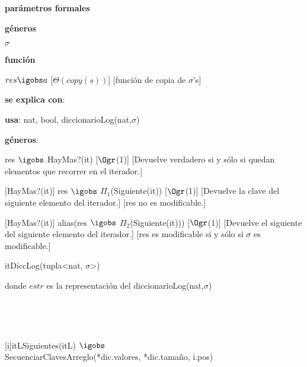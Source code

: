 \begin{Interfaz}

	\textbf{parámetros formales}\parindent\\
	\parbox{1.7cm}{\textbf{géneros}} $\sigma$\\
	\parbox[t]{1.7cm}{\textbf{función}}\parbox[t]{\textwidth-2\parindent-1.7cm}{%
	    	{$res \igobs a$}
		[$\Theta(copy(s))$]
		[función de copia de $\sigma$'s]
	}
	
	\textbf{se explica con}: 
	
	\textbf{usa}: nat, bool, diccionarioLog(nat,$\sigma$)
	
	\textbf{géneros}: 
	


	{res $\igobs$ HayMas?(it)}
	[$\Ogr$(1)]
	[Devuelve verdadero si y sólo si quedan elementos que recorrer en el iterador.]
	
	[HayMas?(it)]
	{res $\igobs$ $\Pi_1$(Siguiente(it))}
	[$\Ogr$(1)]
	[Devuelve la clave del siguiente elemento del iterador.]
	[res no es modificable.]
	
	[HayMas?(it)]
	{alias(res $\igobs$ $\Pi_2$(Siguiente(it)))}
	[$\Ogr$(1)]
	[Devuelve el siguiente del siguiente elemento del iterador.]
	[res es modificable si y sólo si $\sigma$ es modificable.]

\end{Interfaz}	

\begin{Representacion}
	
	\begin{Estructura}{itDiccLog(tupla<nat, $\sigma$>)}
		\begin{Tupla}
		\end{Tupla}
	\tab \hspace{1.2mm}donde $estr$ es la representación del diccionarioLog(nat,$\sigma$)
	\end{Estructura}
		
~
	

~

	{itL}{Siguientes(itL) $\igobs$ \\
	SecuenciarClavesArreglo(*dic.valores, *dic.tamaño, i.pos)}
	
~

	
\end{Representacion}

